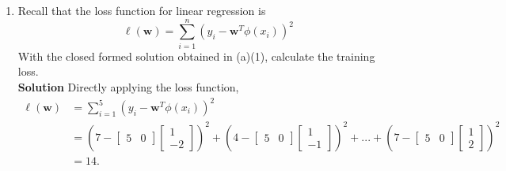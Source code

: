 \documentclass[11pt]{article}
\begin{document}
\begin{enumerate}
			\item Recall that the loss function for linear regression is
			$$\ell(\mathbf{w}) = \sum_{i = 1}^{n} (y_i - \mathbf{w}^T \phi(x_i))^2$$
			With the closed formed solution obtained in (a)(1), calculate the training loss.
			\newline \\
			\textbf{Solution} Directly applying the loss function,
			\begin{align*}
			\ell(\mathbf{w}) & = \sum_{i = 1}^{5} (y_i - \mathbf{w}^T \phi(x_i))^2 \\
			& = (7 -
			\begin{bmatrix}
			5 & 0
			\end{bmatrix} \begin{bmatrix}
			1           \\[0.3em]
			-2
			\end{bmatrix})^2 + (4 -
			\begin{bmatrix}
			5 & 0
			\end{bmatrix} \begin{bmatrix}
			1           \\[0.3em]
			-1
			\end{bmatrix})^2 +...+ (7 -
			\begin{bmatrix}
			5 & 0
			\end{bmatrix} \begin{bmatrix}
			1           \\[0.3em]
			2
			\end{bmatrix})^2 \\
			& = 14.
			\end{align*}
	\end{enumerate}	
\end{document}
